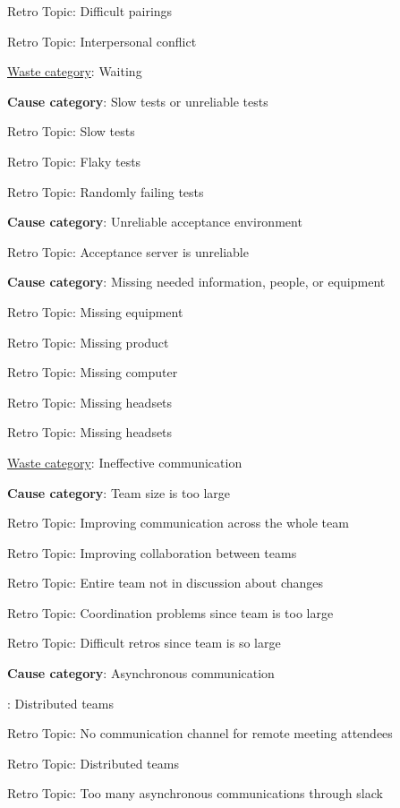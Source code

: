 \quad \quad Retro Topic: Difficult pairings

\quad \quad Retro Topic: Interpersonal conflict


\underline{Waste category}: Waiting

\quad \textbf{Cause category}: Slow tests or unreliable tests

\quad \quad Retro Topic: Slow tests

\quad \quad Retro Topic: Flaky tests

\quad \quad Retro Topic: Randomly failing tests

\quad \textbf{Cause category}: Unreliable acceptance environment

\quad \quad Retro Topic: Acceptance server is unreliable

\quad \textbf{Cause category}: Missing needed information, people, or equipment

\quad \quad Retro Topic: Missing equipment

\quad \quad Retro Topic: Missing product

\quad \quad Retro Topic: Missing computer

\quad \quad Retro Topic: Missing headsets

\quad \quad Retro Topic: Missing headsets

\underline{Waste category}: Ineffective communication

\quad \textbf{Cause category}: Team size is too large

\quad \quad Retro Topic: Improving communication across the whole team

\quad \quad Retro Topic: Improving collaboration between teams

\quad \quad Retro Topic: Entire team not in discussion about changes

\quad \quad Retro Topic: Coordination problems since team is too large

\quad \quad Retro Topic: Difficult retros since team is so large

\quad \textbf{Cause category}: Asynchronous communication

\quad {}: Distributed teams

\quad \quad \quad Retro Topic: No communication channel for remote meeting attendees

\quad \quad \quad Retro Topic: Distributed teams

\quad \quad \quad Retro Topic: Too many asynchronous communications through slack

